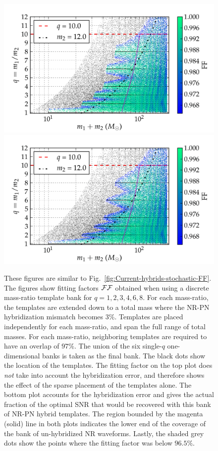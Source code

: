 \begin{figure}
\begin{center}
\includegraphics[width=0.9\columnwidth]{figures/nrhybbank/bank_26022013_02_mtot200_logMq_NOhybMM-tiny.png}
\includegraphics[width=0.9\columnwidth]{figures/nrhybbank/bank_26022013_02_mtot200_logMq_hybMM-tiny.png}
\caption{\label{fig:Current-hybrids-FF}These figures are similar to 
  Fig.~\ref{fig:Current-hybrids-stochastic-FF}. The figures show fitting
  factors $\mathcal{FF}$ obtained when using a discrete mass-ratio template bank for
  $q=1,2,3,4,6,8$. For each mass-ratio, the templates are extended down 
  to a total mass where the NR-PN hybridization mismatch becomes
  $3\%$. Templates are placed independently for each mass-ratio, and span the 
  full range of total masses. For each mass-ratio, neighboring templates are 
  required to have an overlap of $97\%$. The union of the six single-$q$ 
  one-dimensional banks is taken as the final bank. The black dots show the 
  location of the templates. The fitting factor on the top plot does 
  {\em not} take into account the hybridization error, and therefore shows the
  effect of the sparse placement of the templates alone. The bottom plot accounts
  for the hybridization error
  and gives the actual fraction of the optimal SNR that would be recovered
  with this bank of NR-PN hybrid templates. The region bounded by the magenta 
  (solid) line in both plots indicates the lower end of the coverage of the 
  bank of un-hybridized NR waveforms. Lastly, the shaded grey dots show the 
  points where the fitting factor was below $96.5\%$.}
\end{center}
\end{figure}

